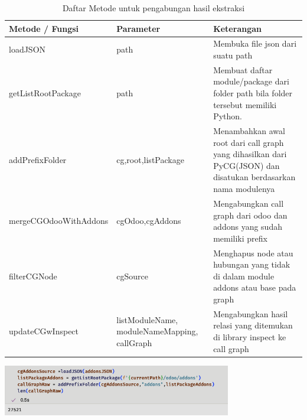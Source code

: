 \begingroup
\setlength{\LTleft}{-20cm plus -1fill}
\setlength{\LTright}{\LTleft}
\begin{small}
	\begin{longtable}{|p{4cm}|p{3cm}|p{6cm}|}
		\caption{Daftar Metode untuk pengabungan hasil ekstraksi}\\
		\hline
		\textbf{Metode / Fungsi} & \textbf{Parameter} & \textbf{Keterangan}\\
		\endfirsthead
		
		\hline  

		loadJSON
		& path
		 & Membuka file json dari suatu path  \\

		 \hline  

		 getListRootPackage
		& path
		 & Membuat daftar module/package dari folder path bila folder tersebut memiliki Python. \\

		 \hline  

		 addPrefixFolder
		& cg,root,listPackage
		 & Menambahkan awal root dari call graph yang dihasilkan dari PyCG(JSON) dan disatukan berdasarkan nama modulenya  \\
		 
		 \hline  

		 mergeCGOdooWithAddons
		& cgOdoo,cgAddons
		 & Mengabungkan call graph dari odoo dan addons yang sudah memiliki prefix  \\


		 \hline  

		 filterCGNode
		& cgSource
		 & Menghapus node atau hubungan yang tidak di dalam module addons atau base pada graph \\

		 \hline
		
		 updateCGwInspect
		& listModuleName, moduleNameMapping, callGraph
		 & Mengabungkan hasil relasi yang ditemukan di library inspect ke call graph  \\

		 \hline
	\end{longtable}
\end{small}
\endgroup

\begin{center}
	\includegraphics[width=10cm]{img/bab_4/ekstraksi_1.png}
	\label{fig:ekstraksi_1}
\end{center}

